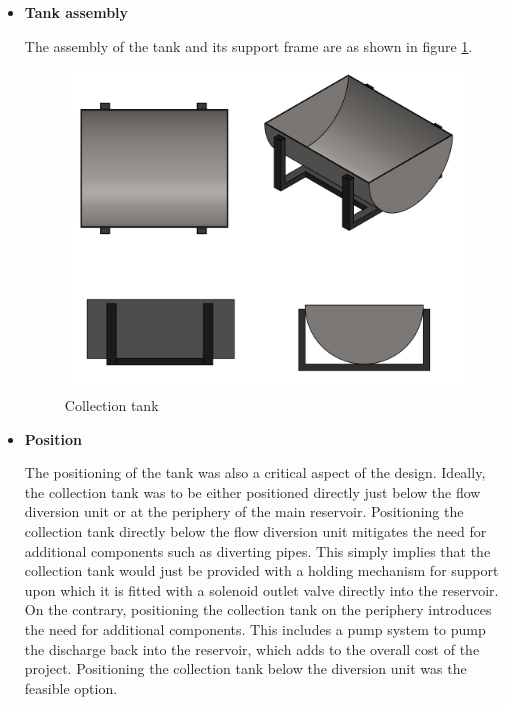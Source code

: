\begin{itemize}
\par
\item \textbf{Tank assembly}
\par
The assembly of the tank and its support frame are as shown in figure \ref{fig:collection_tank}.
\begin{figure}[H]
    \centering
    \includegraphics[height=.45\textheight]{Figures/CollectionTank.PNG}
    \caption{Collection tank}
    \label{fig:collection_tank}
\end{figure}
\par
\item \textbf{Position}
\par
The positioning of the tank was also a critical aspect of the design. Ideally, the collection tank was to be either positioned directly just below the flow diversion unit or at the periphery of the main reservoir. Positioning the collection tank directly below the flow diversion unit mitigates the need for additional components such as diverting pipes. This simply implies that the collection tank would just be provided with a holding mechanism for support upon which it is fitted with a solenoid outlet valve directly into the reservoir. On the contrary, positioning the collection tank on the periphery introduces the need for additional components. This includes a pump system to pump the discharge back into the reservoir, which adds to the overall cost of the project. Positioning the collection tank below the diversion unit was the feasible option.
\end{itemize}

